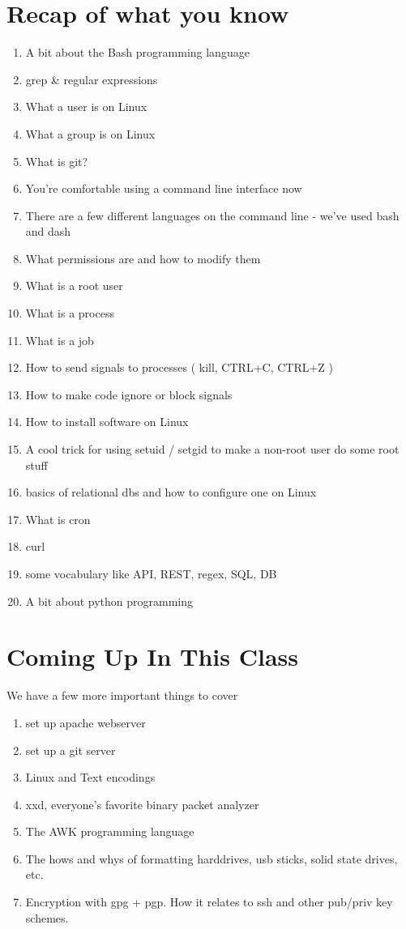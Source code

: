 \documentclass[10pt]{article}
\begin{document}
\section{Recap of what you know}
\begin{enumerate}
\item A bit about the Bash programming language
\item grep \& regular expressions
\item What a user is on Linux
\item What a group is on Linux
\item What is git?
\item You're comfortable using a command line interface now
\item There are a few different languages on the command line - we've used bash and dash
\item What permissions are and how to modify them
\item What is a root user
\item What is a process
\item What is a job
\item How to send signals to processes ( kill, CTRL+C, CTRL+Z )
\item How to make code ignore or block signals
\item How to install software on Linux
\item A cool trick for using setuid / setgid to make a non-root user do some root stuff
\item basics of relational dbs and how to configure one on Linux
\item What is cron
\item curl
\item some vocabulary like API, REST, regex, SQL, DB
\item A bit about python programming
\end{enumerate}

\section{Coming Up In This Class}

We have a few more important things to cover
\begin{enumerate}
\item set up apache webserver
\item set up a git server
\item Linux and Text encodings
\item xxd, everyone's favorite binary packet analyzer
\item The AWK programming language
\item The hows and whys of formatting harddrives, usb sticks, solid state drives, etc.
\item Encryption with gpg + pgp. How it relates to ssh and other pub/priv key schemes.
\end{enumerate}
\end{document}

